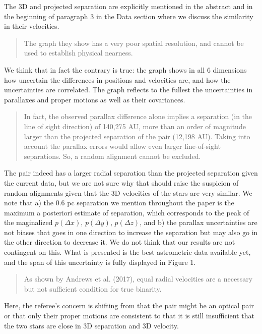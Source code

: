 \documentclass[12pt]{article}
\begin{document}
The 3D and projected separation are explicitly mentioned in the abstract and in
the beginning of paragraph 3 in the Data section where we discuss the similarity
in their velocities.

\begin{quote}
The graph they show has a very poor spatial resolution, and cannot be
used to establish physical nearness.
\end{quote}

We think that in fact the contrary is true: the graph shows in all 6
dimensions how uncertain the differences in positions and velocities
are, and how the uncertainties are correlated. The graph reflects to the
fullest the uncertainties in parallaxes and proper motions as well as
their covariances.

\begin{quote}
In fact, the observed parallax difference alone implies a separation (in
the line of sight direction) of 140,275 AU, more than an order of
magnitude larger than the projected separation of the pair (12,198 AU).
Taking into account the parallax errors would allow even larger
line-of-sight separations. So, a random alignment cannot be excluded.
\end{quote}

The pair indeed has a larger radial separation than the projected
separation given the current data, but we are not sure why that should
raise the suspicion of random alignments given that the 3D
velocities of the stars are very similar. We note that a) the 0.6 pc
separation we mention throughout the paper is the maximum a posteriori
estimate of separation, which corresponds to the peak of the
maginalized $p(\Delta x)$, $p(\Delta y)$, $p(\Delta z)$, and b) the
parallax uncertainties are not biases that goes in one direction to
increase the separation but may also go in the other direction to
decrease it. We do not think that our results are not contingent
on this.
What is presented is the best astrometric data available yet, and the span of
this uncertainty is fully displayed in Figure 1.

\begin{quote}
As shown by Andrews et al. (2017), equal radial velocities are a
necessary but not sufficient condition for true binarity.
\end{quote}

Here, the referee's concern is shifting from that the pair might be an
optical pair or that only their proper motions are consistent to that it
is still insufficient that the two stars are close in 3D separation and
3D velocity.
\end{document}
